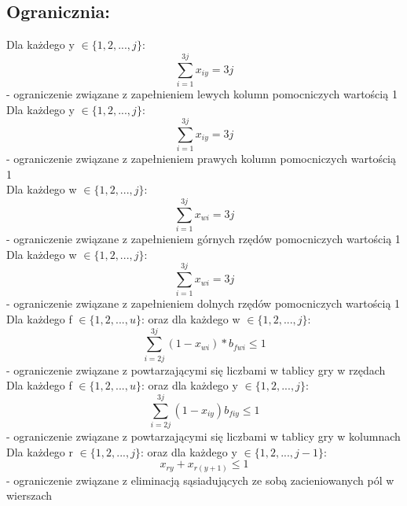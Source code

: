 \documentclass{article}
\begin{document}
\subsection{Ogranicznia:}
Dla każdego y $\in\{1, 2, ..., j\}$:
\begin{equation}
\sum_{i=1}^{3j} x_{iy} = 3j
\end{equation} - ograniczenie związane z zapełnieniem lewych kolumn pomocniczych wartością 1
\\
Dla każdego y $\in\{1, 2, ..., j\}$:
\begin{equation}
\sum_{i=1}^{3j} x_{iy} = 3j
\end{equation} - ograniczenie związane z zapełnieniem prawych kolumn pomocniczych wartością 1
\\
Dla każdego w $\in\{1, 2, ..., j\}$:
\begin{equation}
\sum_{i=1}^{3j} x_{wi} = 3j
\end{equation} - ograniczenie związane z zapełnieniem górnych rzędów pomocniczych wartością 1
\\
Dla każdego w $\in\{1, 2, ..., j\}$:
\begin{equation}
\sum_{i=1}^{3j} x_{wi} = 3j
\end{equation} - ograniczenie związane z zapełnieniem dolnych rzędów pomocniczych wartością 1
\\
Dla każdego f $\in\{1, 2, ..., u\}$: 
    oraz dla każdego w $\in\{1, 2, ..., j\}$:
        \begin{equation}
        \sum_{i=2j}^{3j} (1-x_{wi})*b_{fwi} \leq 1
        \end{equation} - ograniczenie związane z powtarzającymi się liczbami w tablicy gry w rzędach
\\
Dla każdego f $\in\{1, 2, ..., u\}$:
    oraz dla każdego y $\in\{1, 2, ..., j\}$:
        \begin{equation}
        \sum_{i=2j}^{3j} (1-x_{iy})b_{fiy} \leq 1
        \end{equation} - ograniczenie związane z powtarzającymi się liczbami w tablicy gry w kolumnach
\\
Dla każdego r $\in\{1, 2, ..., j\}$:
    oraz dla każdego y $\in\{1, 2, ..., j - 1\}$:
        \begin{equation}
        x_{ry} + x_{r(y+1)} \leq 1
        \end{equation} - ograniczenie związane z eliminacją sąsiadujących ze sobą zacieniowanych pól w wierszach
\end{document}
